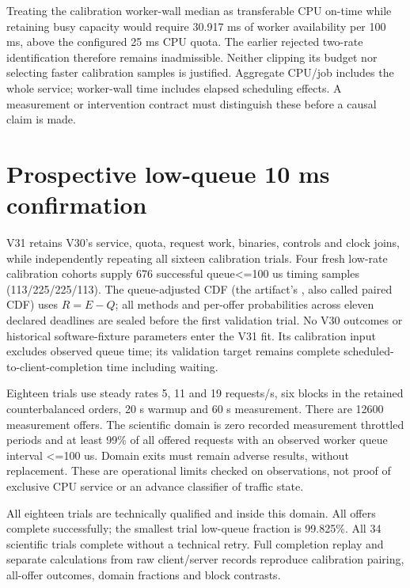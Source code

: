 \documentclass[11pt,a4paper]{article}
\begin{document}
Treating the calibration worker-wall median as transferable CPU on-time while
retaining busy capacity would require 30.917 ms of worker availability per
100 ms, above the configured 25 ms CPU quota. The earlier rejected two-rate
identification therefore remains inadmissible. Neither clipping its budget nor
selecting faster calibration samples is justified. Aggregate CPU/job includes
the whole service; worker-wall time includes elapsed scheduling effects. A
measurement or intervention contract must distinguish these before a causal
claim is made.

\section{Prospective low-queue 10 ms confirmation}

V31 retains V30's service, quota, request work, binaries, controls and clock
joins, while independently repeating all sixteen calibration trials. Four
fresh low-rate calibration cohorts supply 676 successful queue<=100 us timing
samples (113/225/225/113). The queue-adjusted CDF (the artifact's
, also called paired CDF) uses $R=E-Q$;
all methods and per-offer probabilities across eleven declared deadlines are
sealed before the first validation trial. No V30 outcomes or historical
software-fixture parameters enter the V31 fit.
Its calibration input excludes observed queue time; its validation target
remains complete scheduled-to-client-completion time including waiting.

Eighteen trials use steady rates 5, 11 and 19 requests/s, six blocks in the
retained counterbalanced orders, 20 s warmup and 60 s measurement. There are
12600 measurement offers. The scientific domain is zero recorded measurement
throttled periods and at least 99\% of all offered requests with an observed
worker queue interval <=100 us. Domain exits must remain adverse results,
without replacement. These are operational limits checked on observations,
not proof of exclusive CPU service or an advance classifier of traffic state.

All eighteen trials are technically qualified and inside this domain. All
offers complete successfully; the smallest trial low-queue fraction is 99.825\%.
All 34 scientific trials complete without a technical retry. Full completion
replay and separate calculations from raw client/server records reproduce
calibration pairing, all-offer outcomes, domain fractions and block contrasts.
\end{document}
